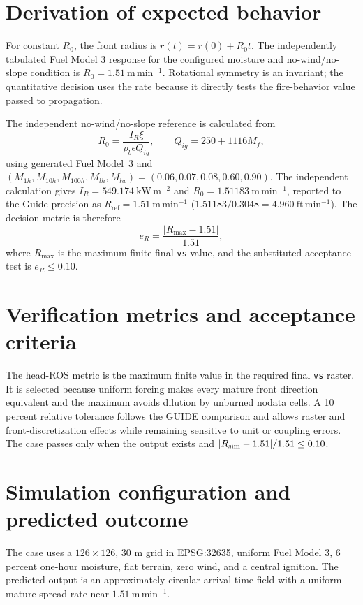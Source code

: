 \section{Derivation of expected behavior}

For constant \(R_0\), the front radius is \(r(t)=r(0)+R_0t\).  The independently tabulated Fuel Model 3 response for the configured moisture and no-wind/no-slope condition is \(R_0=1.51~\mathrm{m\,min^{-1}}\).  Rotational symmetry is an invariant; the quantitative decision uses the rate because it directly tests the fire-behavior value passed to propagation.

The independent no-wind/no-slope reference is calculated from
\[
 R_0=\frac{I_R\xi}{\rho_b\epsilon Q_{ig}},\qquad
 Q_{ig}=250+1116M_f,
\]
using generated Fuel Model~3 and
\((M_{1h},M_{10h},M_{100h},M_{lh},M_{lw})
=(0.06,0.07,0.08,0.60,0.90)\).  The independent calculation gives
\(I_R=549.174~\mathrm{kW\,m^{-2}}\) and
\(R_0=1.51183~\mathrm{m\,min^{-1}}\), reported to the Guide precision as
\(R_{\mathrm{ref}}=1.51~\mathrm{m\,min^{-1}}\)
(\(1.51183/0.3048=4.960~\mathrm{ft\,min^{-1}}\)).
The decision metric is therefore
\[
 e_R=\frac{|R_{\max}-1.51|}{1.51},
\]
where \(R_{\max}\) is the maximum finite final \texttt{vs} value, and the
substituted acceptance test is \(e_R\leq0.10\).

\section{Verification metrics and acceptance criteria}

The head-ROS metric is the maximum finite value in the required final \texttt{vs} raster.  It is selected because uniform forcing makes every mature front direction equivalent and the maximum avoids dilution by unburned nodata cells.  A 10 percent relative tolerance follows the GUIDE comparison and allows raster and front-discretization effects while remaining sensitive to unit or coupling errors.  The case passes only when the output exists and \(|R_{\rm sim}-1.51|/1.51\le0.10\).

\section{Simulation configuration and predicted outcome}

The case uses a \(126\times126\), 30 m grid in EPSG:32635, uniform Fuel Model 3, 6 percent one-hour moisture, flat terrain, zero wind, and a central ignition.  The predicted output is an approximately circular arrival-time field with a uniform mature spread rate near \(1.51~\mathrm{m\,min^{-1}}\).

